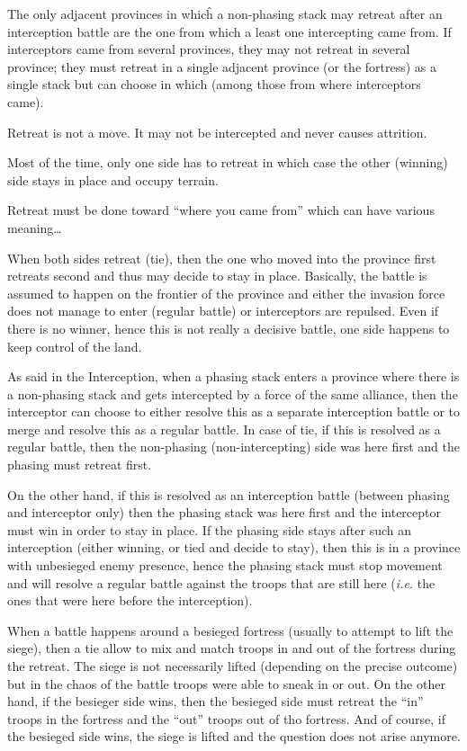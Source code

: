 The only adjacent provinces in whicĥ a non-phasing stack may retreat after an
interception battle are the one from which a least one intercepting \LDE came
from. If interceptors came from several provinces, they may not retreat in
several province; they must retreat in a single adjacent province (or the
fortress) as a single stack but can choose in which (among those from where
interceptors came).

Retreat is not a move. It may not be intercepted and never causes attrition.

\begin{designnote}
  Most of the time, only one side has to retreat in which case the other
  (winning) side stays in place and occupy terrain.

  Retreat must be done toward ``where you came from'' which can have various
  meaning\ldots

  When both sides retreat (tie), then the one who moved into the province
  first retreats second and thus may decide to stay in place. Basically, the
  battle is assumed to happen on the frontier of the province and either the
  invasion force does not manage to enter (regular battle) or interceptors are
  repulsed. Even if there is no winner, hence this is not really a decisive
  battle, one side happens to keep control of the land.

  \smallskip

  As said in the Interception, when a phasing stack enters a province where
  there is a non-phasing stack and gets intercepted by a force of the same
  alliance, then the interceptor can choose to either resolve this as a
  separate interception battle or to merge and resolve this as a regular
  battle. In case of tie, if this is resolved as a regular battle, then the
  non-phasing (non-intercepting) side was here first and the phasing must
  retreat first.

  On the other hand, if this is resolved as an interception battle (between
  phasing and interceptor only) then the phasing stack was here first and the
  interceptor must win in order to stay in place. If the phasing side stays
  after such an interception (either winning, or tied and decide to stay),
  then this is in a province with unbesieged enemy presence, hence the phasing
  stack must stop movement and will resolve a regular battle against the
  troops that are still here (\emph{i.e.} the ones that were here before the
  interception).

  \smallskip

  When a battle happens around a besieged fortress (usually to attempt to lift
  the siege), then a tie allow to mix and match troops in and out of the
  fortress during the retreat. The siege is not necessarily lifted (depending
  on the precise outcome) but in the chaos of the battle troops were able to
  sneak in or out. On the other hand, if the besieger side wins, then the
  besieged side must retreat the ``in'' troops in the fortress and the ``out''
  troops out of tho fortress. And of course, if the besieged side wins, the
  siege is lifted and the question does not arise anymore.
\end{designnote}

